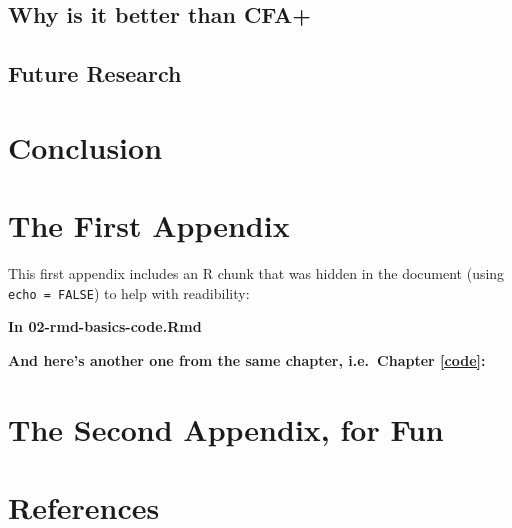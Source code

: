 \documentclass[a4paper, nobind]{templates/ociamthesis}
\begin{document}
\section{Why is it better than CFA+}\label{why-is-it-better-than-cfa}

\section{Future Research}\label{future-research}

\chapter*{Conclusion}\label{conclusion}

\startappendices

\chapter{The First Appendix}\label{the-first-appendix}

This first appendix includes an R chunk that was hidden in the document (using \texttt{echo\ =\ FALSE}) to help with readibility:

\textbf{In 02-rmd-basics-code.Rmd}

\textbf{And here's another one from the same chapter, i.e.~Chapter \ref{code}:}

\chapter{The Second Appendix, for Fun}\label{the-second-appendix-for-fun}

\chapter*{References}\label{references}


\label{refs}

\end{document}

